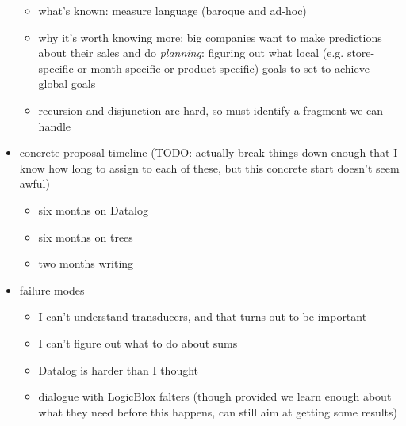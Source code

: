 \documentclass{article}
\begin{document}
\begin{itemize}
        \begin{itemize}
            \item what's known: measure language (baroque and ad-hoc)
            \item why it's worth knowing more: big companies want to make
                predictions about their sales and do \emph{planning}:
                figuring out what local (e.g. store-specific or
                month-specific or product-specific) goals to set to achieve
                global goals
            \item recursion and disjunction are hard, so must identify a
                fragment we can handle
        \end{itemize}
    \item concrete proposal timeline (TODO: actually break things down
        enough that I know how long to assign to each of these, but this
        concrete start doesn't seem awful)
        \begin{itemize}
            \item six months on Datalog
            \item six months on trees
            \item two months writing
        \end{itemize}
    \item failure modes
        \begin{itemize}
            \item I can't understand transducers, and that turns out to be
                important
            \item I can't figure out what to do about sums
            \item Datalog is harder than I thought
            \item dialogue with LogicBlox falters (though provided we learn enough
                about what they need before this happens, can still aim at
                getting some results)
        \end{itemize}
\end{itemize}
\end{document}
